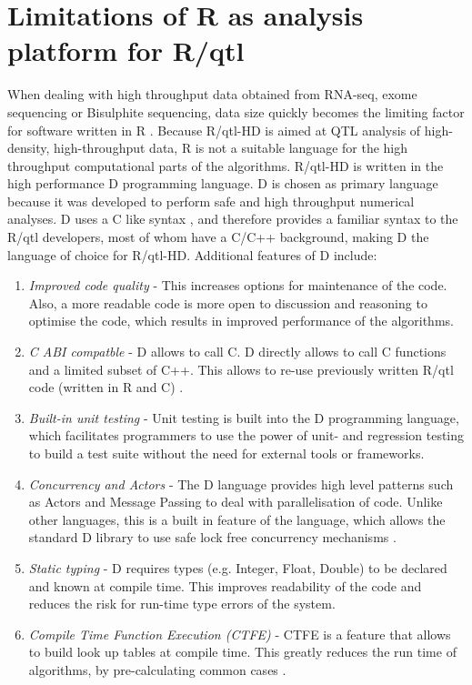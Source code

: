\section{Limitations of R as analysis platform for R/qtl}
\label{sect:limitations}
When dealing with high throughput data obtained from RNA-seq, exome sequencing or Bisulphite sequencing, data size quickly becomes the limiting 
factor for software written in R \cite{Ristić:2009, Patel:2012}. Because R/qtl-HD is aimed at QTL analysis of high-density, high-throughput data, R is not a suitable language 
for the high throughput computational parts of the algorithms. R/qtl-HD is written in the high performance D programming language. D is chosen 
as primary language because it was developed to perform safe and high throughput numerical analyses. D uses a C like syntax \cite{Alexandrescu:2011}, and therefore 
provides a familiar syntax to the R/qtl developers, most of whom have a C/C++ background, making D the language of choice for R/qtl-HD. 
Additional features of D include:

\begin{enumerate}\itemsep1pt
\item \emph{Improved code quality} - This increases options for maintenance of the code. Also, a more readable code is more open to discussion and reasoning 
to optimise the code, which results in improved performance of the algorithms.
\item \emph{C ABI compatble} - D allows to call C. D directly allows to call C functions and a limited subset of C++. This allows to re-use previously written R/qtl code 
(written in R and C) \cite{RQTLGuide:2009}.
\item \emph{Built-in unit testing} - Unit testing is built into the D programming language, which facilitates programmers to use the power of unit- and 
regression testing to build a test suite without the need for external tools or frameworks.
\item \emph{Concurrency and Actors} - The D language provides high level patterns such as Actors and Message Passing to deal with parallelisation of code. 
Unlike other languages, this is a built in feature of the language, which allows the standard D library to use safe lock free concurrency mechanisms \cite{Alexandrescu:2011}.
\item \emph{Static typing} - D requires types (e.g. Integer, Float, Double) to be declared and known at compile time. This improves readability of the code 
and reduces the risk for run-time type errors of the system.
\item \emph{Compile Time Function Execution (CTFE)} - CTFE is a feature that allows to build look up tables at compile time. This greatly reduces the run 
time of algorithms, by pre-calculating common cases \cite{ArendsBlog:2012}.
\end{enumerate}

